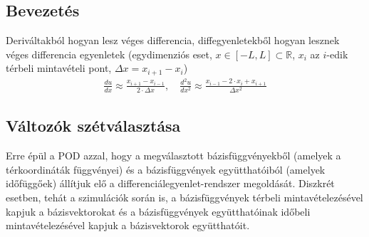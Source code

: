         \subsection*{Bevezetés}
            Deriváltakból hogyan lesz véges differencia, diffegyenletekből hogyan lesznek véges differencia egyenletek (egydimenziós eset, $x \in [-L, L] \subset \mathbb{R}$, $x_i$ az $i$-edik térbeli mintavételi pont, $\Delta x = x_{i+1} - x_i$) \\
            \begin{align*}
                \frac{d u}{d x} \approx \frac{x_{i+1}-x_{i-1}}{2\cdot \Delta x}, \quad
                \frac{d^2 u}{d x^2} \approx \frac{x_{i-1}-2\cdot x_{i}+x_{i+1}}{\Delta x^2}
            \end{align*}
        \subsection*{Változók szétválasztása} Erre épül a POD azzal, hogy a megválasztott bázisfüggvényekből (amelyek a térkoordináták függvényei) és a bázisfüggvények együtthatóiból (amelyek időfüggőek) állítjuk elő a differenciálegyenlet-rendszer megoldását. Diszkrét esetben, tehát a szimulációk során is, a bázisfüggvények térbeli mintavételezésével kapjuk a bázisvektorokat és a bázisfüggvények együtthatóinak időbeli mintavételezésével kapjuk a bázisvektorok együtthatóit.



 
